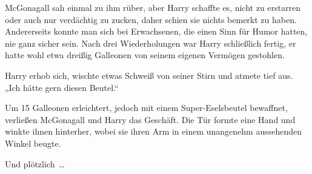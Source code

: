 McGonagall sah einmal zu ihm rüber, aber Harry schaffte es, nicht zu erstarren oder auch nur verdächtig zu zucken, daher schien sie nichts bemerkt zu haben. Andererseits konnte man sich bei Erwachsenen, die einen Sinn für Humor hatten, nie ganz sicher sein.
Nach drei Wiederholungen war Harry schließlich fertig, er hatte wohl etwa dreißig Galleonen von seinem eigenen Vermögen gestohlen.

Harry erhob sich, wischte etwas Schweiß von seiner Stirn und atmete tief aus. „Ich hätte gern diesen Beutel.“

Um 15 Galleonen erleichtert, jedoch mit einem Super-Eselsbeutel  bewaffnet, verließen McGonagall und Harry das Geschäft. Die Tür formte eine Hand und winkte ihnen hinterher, wobei sie ihren Arm in einem unangenehm aussehenden Winkel beugte.

Und plötzlich …


